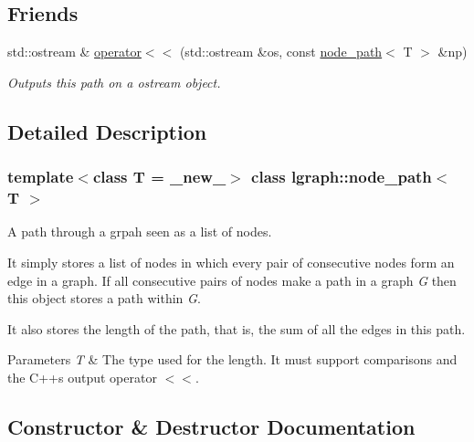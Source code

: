 \subsection*{Friends}
\begin{DoxyCompactItemize}
\item 
std\+::ostream \& \hyperlink{classlgraph_1_1node__path_a97671ba034a7baa54df38ba323d7a48e}{operator$<$$<$} (std\+::ostream \&os, const \hyperlink{classlgraph_1_1node__path}{node\+\_\+path}$<$ T $>$ \&np)
\begin{DoxyCompactList}\small\item\em Outputs this path on a {\itshape ostream} object. \end{DoxyCompactList}\end{DoxyCompactItemize}


\subsection{Detailed Description}
\subsubsection*{template$<$class T = \+\_\+new\+\_\+$>$\newline
class lgraph\+::node\+\_\+path$<$ T $>$}

A path through a grpah seen as a list of nodes. 

It simply stores a list of nodes in which every pair of consecutive nodes form an edge in a graph. If all consecutive pairs of nodes make a path in a graph {\itshape G} then this object stores a path within {\itshape G}.

It also stores the length of the path, that is, the sum of all the edges in this path.


\begin{DoxyParams}{Parameters}
{\em T} & The type used for the length. It must support comparisons and the C++\textquotesingle{}s output operator $<$$<$. \\
\hline
\end{DoxyParams}


\subsection{Constructor \& Destructor Documentation}
\mbox{\label{classlgraph_1_1node__path_ae998efffa65b591d68fbab35f2218120}} 
